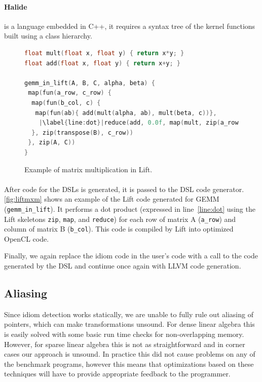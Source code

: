 \paragraph{Halide} is a language embedded in C++, it requires a syntax tree of the kernel functions built using a class hierarchy.

\begin{figure}[ht]
\begin{lstlisting}[language=C,escapechar=|]
float mult(float x, float y) { return x*y; }
float add(float x, float y) { return x+y; }

gemm_in_lift(A, B, C, alpha, beta) {
 map(fun(a_row, c_row) {
  map(fun(b_col, c) {
   map(fun(ab){ add(mult(alpha, ab), mult(beta, c))},
    |\label{line:dot}|reduce(add, 0.0f, map(mult, zip(a_row, b_col))))
  }, zip(transpose(B), c_row))
 }, zip(A, C))
}
\end{lstlisting}
\vspace{-.3cm}
\caption{Example of matrix multiplication in Lift.}
\label{fig:liftmxm}
\vspace{-1em}
\end{figure}

\paragraph{}
After code for the DSLs is generated, it is passed to the DSL code generator.
\autoref{fig:liftmxm} shows an example of the Lift code generated for GEMM (\texttt{gemm\_in\_lift}).
It performs a dot product (expressed in line~\ref{line:dot} using the Lift skeletons \texttt{zip}, \texttt{map}, and \texttt{reduce}) for each row of matrix A (\texttt{a\_row}) and column of matrix B (\texttt{b\_col}).
This code is compiled by Lift into optimized OpenCL code.

Finally, we again replace the idiom code in the user's code with a call to the code generated by the DSL and continue once again with LLVM code generation.

\subsection{Aliasing}

    Since idiom detection works statically, we are unable to fully rule out
    aliasing of pointers, which can make transformations unsound.
    For dense linear algebra this is easily solved with some basic run time
    checks for non-overlapping memory.
    However, for sparse linear algebra this is not as straightforward and in
    corner cases our approach is unsound.
    In practice this did not cause problems on any of the benchmark programs,
    however this means that optimizations based on these techniques will have to
    provide appropriate feedback to the programmer.

